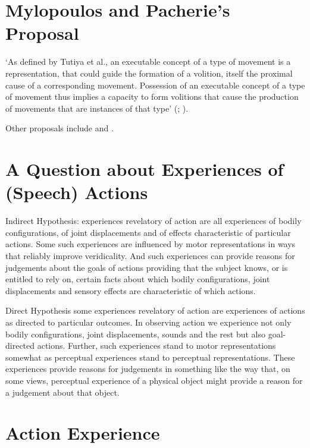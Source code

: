 \documentclass[12pt]{extarticle}
\begin{document}
\begin{multicols*}{3}
 
 
 
\section{Mylopoulos and Pacherie’s Proposal}
 
‘As defined by Tutiya et al., an executable concept of a type of movement is a
representation, that could guide the formation of a volition, itself the proximal cause of
a corresponding movement. Possession of an executable concept of a type of movement thus
implies a capacity to form volitions that cause the production of movements that are
instances of that type’
(\citealp[p.~7]{pacherie:2011_nonconceptual}; \citealp{mylopoulos:2016_intentions}).
 
Other proposals include \citet{burnston:2017_interface} and \citet{shepherd:2018_skilled}.
 
 
\section{A Question about Experiences of (Speech) Actions}

Indirect Hypothesis:  experiences revelatory of action are all experiences of bodily configurations, of joint displacements and of effects characteristic of particular actions.  Some such experiences are influenced by motor representations in ways that reliably improve veridicality.  And such experiences can provide reasons for judgements about the goals of actions providing that the subject knows, or is entitled to rely on, certain facts about which bodily configurations, joint displacements and  sensory effects are characteristic of which actions.

Direct Hypothesis some experiences revelatory of action are experiences of actions as directed to particular outcomes.  In observing action we experience not only bodily configurations, joint displacements, sounds and the rest but also goal-directed actions.  Further, such experiences stand to motor representations somewhat as perceptual experiences stand to perceptual representations.  These experiences provide reasons for judgements in something like the way that, on some views, perceptual experience of a physical object might provide a reason for a judgement about that object.
 
 
\section{Action Experience}
 

\end{multicols*}
\end{document}
